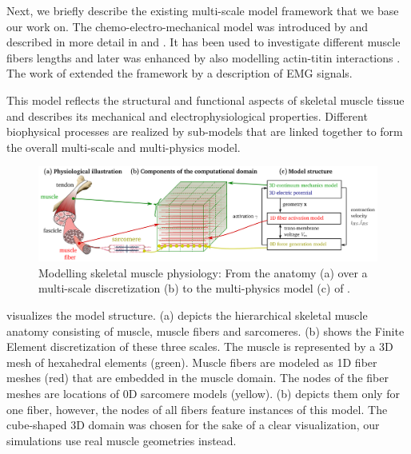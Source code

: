 Next, we briefly describe the existing multi-scale model framework that we base our work on.
The chemo-electro-mechanical model was introduced by \cite{Roehrle2012} and described in more detail in \cite{Heidlauf2013} and \cite{Heidlauf2015Diss}. It has been used to investigate different muscle fibers lengths \cite{Heidlauf2014} and later was enhanced by also modelling actin-titin interactions \cite{Heidlauf2016}. The work of \cite{Mordhorst2015} extended the framework by a description of EMG signals.

This model reflects the structural and functional aspects of skeletal muscle tissue and describes its mechanical and electrophysiological properties. Different biophysical processes are realized by sub-models that are linked together to form the overall multi-scale and multi-physics model.

\begin{figure}
  \centering%
  \includegraphics[width=\textwidth]{images/introduction/model_scheme_overview.pdf}%
  \caption{Modelling skeletal muscle physiology: From the anatomy (a) over a multi-scale discretization (b) to the multi-physics model (c) of \cite{Roehrle2012}.}%
  \label{fig:model_scheme_overview_full}%
\end{figure}%

 visualizes the model structure.  (a) depicts the hierarchical skeletal muscle anatomy consisting of muscle, muscle fibers and sarcomeres.  (b) shows the Finite Element discretization of these three scales. The muscle is represented by a 3D mesh of hexahedral elements (green). Muscle fibers are modeled as 1D fiber meshes (red) that are embedded in the muscle domain. The nodes of the fiber meshes are locations of 0D sarcomere models (yellow).  (b) depicts them only for one fiber, however, the nodes of all fibers feature instances of this model. The cube-shaped 3D domain was chosen for the sake of a clear visualization, our simulations use real muscle geometries instead.

